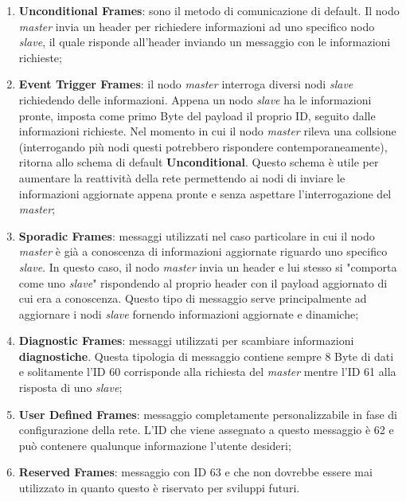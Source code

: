 \begin{enumerate}
    \item \textbf{Unconditional Frames}: sono il metodo di comunicazione di default. Il nodo \emph{master} invia un header per richiedere informazioni ad uno specifico nodo \emph{slave}, il quale risponde all'header inviando un messaggio con le informazioni richieste; \cite{css_electronics_lin}
    \item \textbf{Event Trigger Frames}: il nodo \emph{master} interroga diversi nodi \emph{slave} richiedendo delle informazioni. Appena un nodo \emph{slave} ha le informazioni pronte, imposta come primo Byte del payload il proprio ID, seguito dalle informazioni richieste. Nel momento in cui il nodo \emph{master} rileva una collsione (interrogando più nodi questi potrebbero rispondere contemporaneamente), ritorna allo schema di default \textbf{Unconditional}. Questo schema è utile per aumentare la reattività della rete permettendo ai nodi di inviare le informazioni aggiornate appena pronte e senza aspettare l'interrogazione del \emph{master}; \cite{wikipedia_lin}
    \item \textbf{Sporadic Frames}: messaggi utilizzati nel caso particolare in cui il nodo \emph{master} è già a conoscenza di informazioni aggiornate riguardo uno specifico \emph{slave}. In questo caso, il nodo \emph{master} invia un header e lui stesso si "comporta come uno \emph{slave}" rispondendo al proprio header con il payload aggiornato di cui era a conoscenza. Questo tipo di messaggio serve principalmente ad aggiornare i nodi \emph{slave} fornendo informazioni aggiornate e dinamiche;
    \item \textbf{Diagnostic Frames}: messaggi utilizzati per scambiare informazioni \textbf{diagnostiche}. Questa tipologia di messaggio contiene sempre 8 Byte di dati e solitamente l'ID 60 corrisponde alla richiesta del \emph{master} mentre l'ID 61 alla risposta di uno \emph{slave};
    \item \textbf{User Defined Frames}: messaggio completamente personalizzabile in fase di configurazione della rete. L'ID che viene assegnato a questo messaggio è 62 e può contenere qualunque informazione l'utente desideri;
    \item \textbf{Reserved Frames}: messaggio con ID 63 e che non dovrebbe essere mai utilizzato in quanto questo è riservato per sviluppi futuri. \cite{css_electronics_lin}
\end{enumerate}

